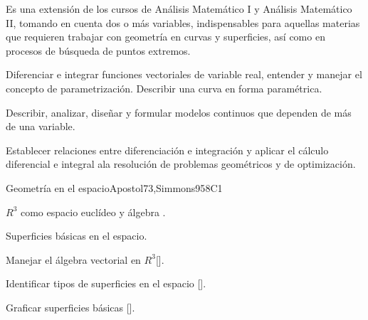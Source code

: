 \begin{syllabus}


\begin{justification}
Es una extensión de los cursos de Análisis Matemático I y Análisis Matemático II, tomando en cuenta dos o más variables, indispensables para aquellas materias que requieren trabajar con geometría en curvas y superficies, así como en procesos de búsqueda de puntos extremos.
\end{justification}

\begin{goals}
\item Diferenciar e integrar funciones vectoriales de variable real, entender y manejar el concepto de parametrización. Describir una curva en forma paramétrica.
\item Describir, analizar, diseñar y formular modelos continuos que dependen de más de una variable.
\item Establecer relaciones entre diferenciación e integración y aplicar el cálculo diferencial e integral ala resolución de problemas geométricos y de optimización.
\end{goals}

\begin{outcomes}
    \item {}
    \item {}
\end{outcomes}

\begin{competences}
    \item {} 
    \item {} 
    \item {}
\end{competences}

\begin{unit}{}{Geometría en el espacio}{Apostol73,Simmons95}{8}{C1}
   \begin{topics}
      \item $R^3$ como espacio euclídeo y álgebra .
      \item Superficies básicas en el espacio.
   \end{topics}
   \begin{learningoutcomes}
      \item Manejar el álgebra vectorial en $R^3$[\Usage].
      \item Identificar tipos de superficies en el espacio [\Usage].
      \item Graficar superficies básicas [\Usage].
      \end{learningoutcomes}
\end{unit}


\end{syllabus}
